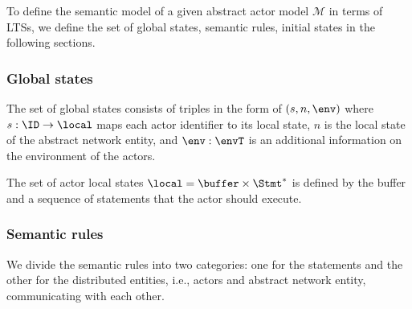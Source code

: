 To define the semantic model of a given abstract actor model $\mathcal{M}$ in terms of LTSs, we define the set of global states, semantic rules, initial states in the following sections.

 



\subsubsection{Global states}
The set of global states consists of triples in the form of $(s,n,\env)$ where $s: \ID\rightarrow \local$ maps each actor identifier to its local state, $n$ is the local state of the abstract network entity, and $\env:\envT$ is an additional information on the environment of the actors. 

The set of actor local states $\local = \buffer\times 
\Stmt^\ast$ is defined by the buffer and a sequence of statements that the actor should execute. 



\subsubsection{Semantic rules}
We divide the semantic rules into two categories: one for the statements and the other for the distributed entities, i.e., actors and abstract network entity, communicating with each other.   



